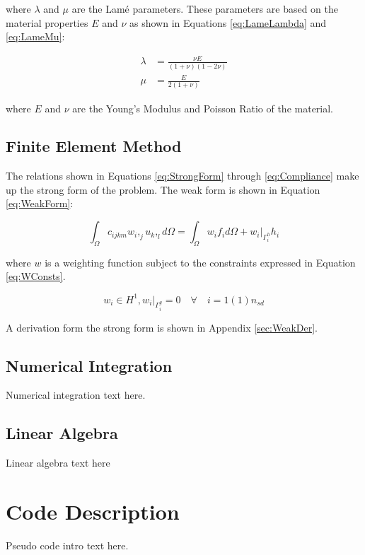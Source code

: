 \documentclass[a4paper, 12pt]{article}
\begin{document}
\noindent
where $\lambda$ and $\mu$ are the Lam\'e parameters.
These parameters are based on the material properties $E$ and $\nu$
as shown in Equations \ref{eq:LameLambda} and \ref{eq:LameMu}:

\begin{align}
\lambda &= \frac{ \nu E }{(1+\nu) (1-2\nu) }
  \label{eq:LameLambda} \\
\mu &= \frac{ E}{ 2( 1+\nu)}
  \label{eq:LameMu}
\end{align}

\noindent
where $E$ and $\nu$ are the Young's Modulus and Poisson Ratio
of the material.

\subsection{Finite Element Method} \label{subsec:fem}
The relations shown in Equations \ref{eq:StrongForm} through
\ref{eq:Compliance} make up the strong form of the problem.
The weak form is shown in Equation \ref{eq:WeakForm}:

\begin{equation} \label{eq:WeakForm}
\int_{\Omega} c_{ijkm} w_{i},_{j} u_{k},_{l} d\Omega =
  \int_{\Omega} w_{i} f_{i} d\Omega +
  w_{i}\Big|_{\Gamma^{h}_{i}} h_{i}
\end{equation}

\noindent
where $w$ is a weighting function subject to the constraints
expressed in Equation \ref{eq:WConsts}.

\begin{equation} \label{eq:WConsts}
w_{i} \in H^1, w_{i}\Big|_{\Gamma^{g}_{i}} = 0
    \quad \forall \quad i=1(1)n_{sd}
\end{equation}

\noindent
A derivation form the strong form is shown in Appendix \ref{sec:WeakDer}.

\subsection{Numerical Integration} \label{subsec:numInt}
Numerical integration text here.

\subsection{Linear Algebra} \label{subsec:LinAlg}
Linear algebra text here

\section{Code Description} \label{sec:codeDes}
Pseudo code intro text here.
\end{document}
